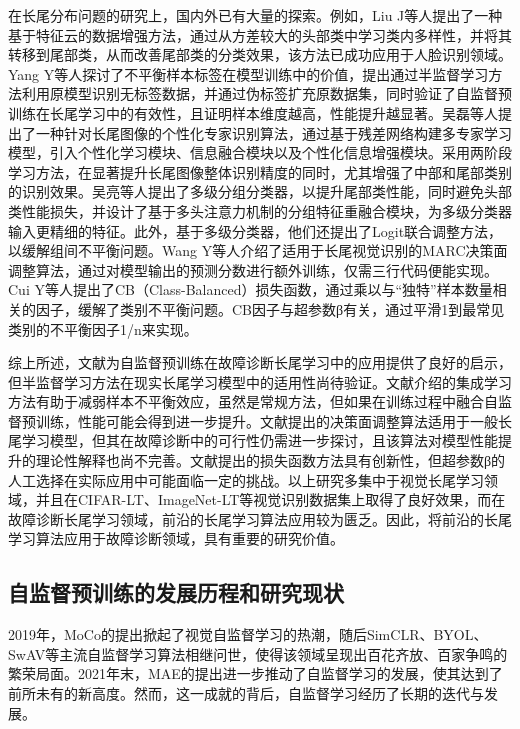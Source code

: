 \documentclass[master]{thesis-uestc}
\begin{document}
在长尾分布问题的研究上，国内外已有大量的探索。例如，Liu J等人提出了一种基于特征云的数据增强方法，通过从方差较大的头部类中学习类内多样性，并将其转移到尾部类，从而改善尾部类的分类效果，该方法已成功应用于人脸识别领域。Yang Y等人探讨了不平衡样本标签在模型训练中的价值，提出通过半监督学习方法利用原模型识别无标签数据，并通过伪标签扩充原数据集，同时验证了自监督预训练在长尾学习中的有效性，且证明样本维度越高，性能提升越显著。吴磊等人提出了一种针对长尾图像的个性化专家识别算法，通过基于残差网络构建多专家学习模型，引入个性化学习模块、信息融合模块以及个性化信息增强模块。采用两阶段学习方法，在显著提升长尾图像整体识别精度的同时，尤其增强了中部和尾部类别的识别效果。吴亮等人提出了多级分组分类器，以提升尾部类性能，同时避免头部类性能损失，并设计了基于多头注意力机制的分组特征重融合模块，为多级分类器输入更精细的特征。此外，基于多级分类器，他们还提出了Logit联合调整方法，以缓解组间不平衡问题。Wang Y等人介绍了适用于长尾视觉识别的MARC决策面调整算法，通过对模型输出的预测分数进行额外训练，仅需三行代码便能实现。Cui Y等人提出了CB（Class-Balanced）损失函数，通过乘以与“独特”样本数量相关的因子，缓解了类别不平衡问题。CB因子与超参数β有关，通过平滑1到最常见类别的不平衡因子1/n来实现。

综上所述，文献\cite{yang2020rethinking}为自监督预训练在故障诊断长尾学习中的应用提供了良好的启示，但半监督学习方法在现实长尾学习模型中的适用性尚待验证。文献\cite{wu2023personalized,吴亮2023基于多级学习的长尾分布下交通多目标检测}介绍的集成学习方法有助于减弱样本不平衡效应，虽然是常规方法，但如果在训练过程中融合自监督预训练，性能可能会得到进一步提升。文献\cite{wang2023margin}提出的决策面调整算法适用于一般长尾学习模型，但其在故障诊断中的可行性仍需进一步探讨，且该算法对模型性能提升的理论性解释也尚不完善。文献\cite{cui2019class}提出的损失函数方法具有创新性，但超参数β的人工选择在实际应用中可能面临一定的挑战。以上研究多集中于视觉长尾学习领域，并且在CIFAR-LT、ImageNet-LT等视觉识别数据集上取得了良好效果，而在故障诊断长尾学习领域，前沿的长尾学习算法应用较为匮乏。因此，将前沿的长尾学习算法应用于故障诊断领域，具有重要的研究价值。

\subsection{自监督预训练的发展历程和研究现状}

2019年，MoCo的提出掀起了视觉自监督学习的热潮，随后SimCLR、BYOL、SwAV等主流自监督学习算法相继问世，使得该领域呈现出百花齐放、百家争鸣的繁荣局面。2021年末，MAE的提出进一步推动了自监督学习的发展，使其达到了前所未有的新高度。然而，这一成就的背后，自监督学习经历了长期的迭代与发展。
\end{document}
